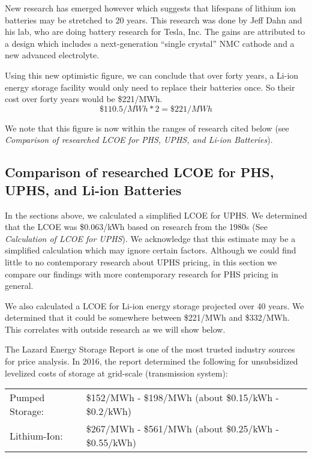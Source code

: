 New research has emerged however which suggests that lifespans of lithium ion batteries may be stretched to 20 years. \cite{ExcellentLithiumIonCellChemistry} This research was done by Jeff Dahn and his lab, who are doing battery research for Tesla, Inc. The gains are attributed to a design which includes a next-generation “single crystal” NMC cathode and a new advanced electrolyte.

Using this new optimistic figure, we can conclude that over forty years, a Li-ion energy storage facility would only need to replace their batteries once. So their cost over forty years would be \$221/MWh.
\[ \$110.5/MWh * 2  = \$221/MWh \]

We note that this figure is now within the ranges of research cited below (see \textit{Comparison of researched LCOE for PHS, UPHS, and Li-ion Batteries}).


\subsection{Comparison of researched LCOE for PHS, UPHS, and Li-ion Batteries}
In the sections above, we calculated a simplified LCOE for UPHS. We determined that the LCOE was \$0.063/kWh based on research from the 1980s (See \textit{Calculation of LCOE for UPHS}). We acknowledge that this estimate may be a simplified calculation which may ignore certain factors. Although we could find little to no contemporary research about UPHS pricing, in this section we compare our findings with more contemporary research for PHS pricing in general.

We also calculated a LCOE for Li-ion energy storage projected over 40 years. We determined that it could be somewhere between \$221/MWh and \$332/MWh. This correlates with outside research as we will show below.

The Lazard Energy Storage Report is one of the most trusted industry sources for price analysis. In 2016, the report determined the following for unsubsidized levelized costs of storage at grid-scale (transmission system)\cite{LazardsLevelizedCostOfStorageAnalysis2016Version2}:

\begin{tabular}{ ll }
Pumped Storage: & \$152/MWh - \$198/MWh  (about \$0.15/kWh - \$0.2/kWh) \\
Lithium-Ion: & \$267/MWh - \$561/MWh  (about \$0.25/kWh - \$0.55/kWh) \\
\end{tabular}

